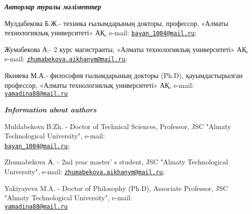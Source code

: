 \begin{authorinfo}
\emph{{\bfseries Авторлар туралы мәліметтер}}

Мулдабекова Б.Ж.- техника ғылымдарының докторы, профессор, «Алматы
технологиялық университеті» АҚ, e-mail:
\href{mailto:bayan\_1004@mail.ru}{\nolinkurl{bayan\_1004@mail.ru}};

Жумабекова А.- 2 курс магистранты, «Алматы технологиялық университеті»
АҚ, e-mail:
\href{mailto:zhumabekova.aikhanym@mail.ru}{\nolinkurl{zhumabekova.aikhanym@mail.ru}};

Якияева М.А.- философия ғылымдарының докторы (Ph.D), қауымдастырылған
профессор, «Алматы технологиялық университеті» АҚ, e-mail:
\href{mailto:yamadina88@mail.ru}{\nolinkurl{yamadina88@mail.ru}}

\emph{{\bfseries Information about authors}}

Muldabekova B.Zh. - Doctor of Technical Sciences, Professor, JSC "Almaty
Technological University", e-mail:\\
\href{mailto:bayan\_1004@mail.ru}{\nolinkurl{bayan\_1004@mail.ru}};

Zhumabekova А. - 2nd year master' s student, JSC "Almaty
Technological University", e-mail:
\href{mailto:zhumabekova.aikhanym@mail.ru}{\nolinkurl{zhumabekova.aikhanym@mail.ru}};

Yakiyayeva M.A. - Doctor of Philosophy (Ph.D), Associate Professor, JSC
"Almaty Technological University", e-mail:\\
\href{mailto:yamadina88@mail.ru}{\nolinkurl{yamadina88@mail.ru}}
\end{authorinfo}
